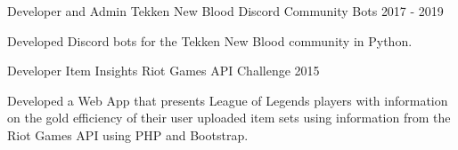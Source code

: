 

\begin{cventries}

  \cventry
    {Developer and Admin} %
    {Tekken New Blood} %
    {Discord Community Bots} %
    {2017 - 2019} %
    {
      \begin{cvitems} %
        \item {Developed Discord bots for the Tekken New Blood community in Python.}
      \end{cvitems}
    }
  \cventry
    {Developer} %
    {Item Insights} %
    {Riot Games API Challenge} %
    {2015} %
    {
      \begin{cvitems} %
        \item {Developed a Web App that presents League of Legends players with information on the gold efficiency of their user uploaded item sets using information from the Riot Games API using PHP and Bootstrap.}
      \end{cvitems}
    }
\end{cventries}
